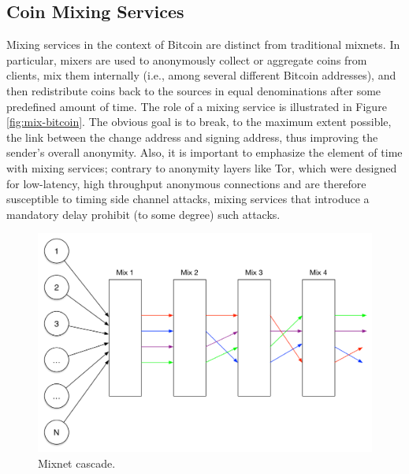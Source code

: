 

\subsection{Coin Mixing Services}
Mixing services in the context of Bitcoin are distinct from traditional mixnets. In particular, mixers are used to anonymously collect or aggregate coins from clients, mix them internally (i.e., among several different Bitcoin addresses), and then redistribute coins back to the sources in equal denominations after some predefined amount of time. The role of a mixing service is illustrated in Figure \ref{fig:mix-bitcoin}. The obvious goal is to break, to the maximum extent possible, the link between the change address and signing address, thus improving the sender's overall anonymity. Also, it is important to emphasize the element of time with mixing services; contrary to anonymity layers like Tor, which were designed for low-latency, high throughput anonymous connections and are therefore susceptible to timing side channel attacks, mixing services that introduce a mandatory delay prohibit (to some degree) such attacks.

\begin{figure}
\begin{center}
\includegraphics[scale=0.35]{images/mix_design.pdf}
\caption{Mixnet cascade.}
\label{fig:mix-design}
\end{center}
\end{figure}

